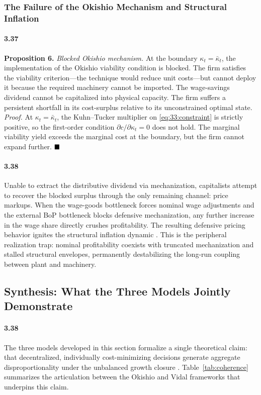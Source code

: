 \subsubsection{The Failure of the Okishio Mechanism and
	Structural Inflation}

\paragraph{3.37}
\textbf{Proposition 6.} \textit{Blocked Okishio mechanism.}
At the boundary $\kappa_t = \bar{\kappa}_t$, the
implementation of the Okishio viability condition is blocked.
The firm satisfies the viability criterion---the technique
would reduce unit costs---but cannot deploy it because the
required machinery cannot be imported. The wage-savings
dividend cannot be capitalized into physical capacity. The
firm suffers a persistent shortfall in its cost-surplus
relative to its unconstrained optimal state.
\textit{Proof.} At $\kappa_t = \bar{\kappa}_t$, the
Kuhn--Tucker multiplier on \eqref{eq:33:constraint} is
strictly positive, so the first-order condition
$\partial c / \partial \kappa_t = 0$ does not hold. The
marginal viability yield exceeds the marginal cost at the
boundary, but the firm cannot expand further.
$\hfill\blacksquare$

\paragraph{3.38}
Unable to extract the distributive dividend via mechanization,
capitalists attempt to recover the blocked surplus through the
only remaining channel: price markups. When the wage-goods
bottleneck forces nominal wage adjustments and the external BoP
bottleneck blocks defensive mechanization, any further increase
in the wage share directly crushes profitability. The resulting
defensive pricing behavior ignites the structural inflation
dynamic \citep{Sunkel1958, Prebisch1981}. This is the
peripheral realization trap: nominal profitability coexists
with truncated mechanization and stalled structural envelopes,
permanently destabilizing the long-run coupling between plant
and machinery.


\subsection{Synthesis: What the Three Models Jointly
	Demonstrate}

\paragraph{3.38}
The three models developed in this section formalize a single
theoretical claim: that decentralized, individually
cost-minimizing decisions generate aggregate
disproportionality under the unbalanced growth closure
\citep{Okishio1961, Basu2026}.
Table~\ref{tab:coherence} summarizes the articulation
between the Okishio and Vidal frameworks that underpins
this claim.

